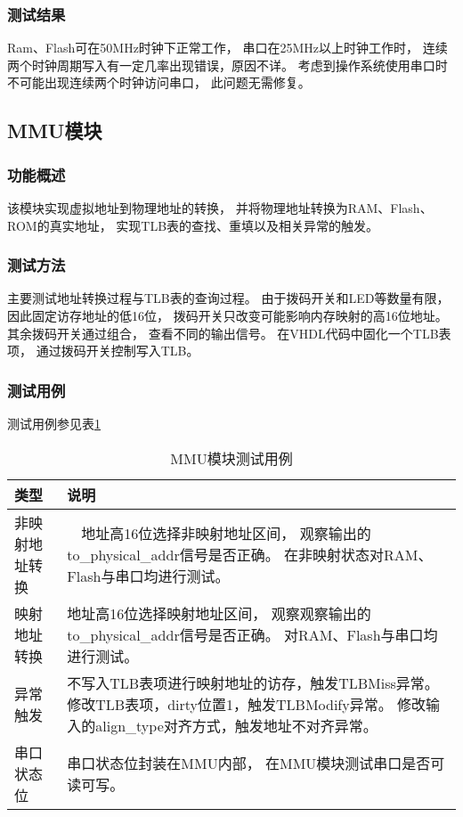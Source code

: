         \subsubsection{测试结果}
            Ram、Flash可在50MHz时钟下正常工作，%
            串口在25MHz以上时钟工作时，%
            连续两个时钟周期写入有一定几率出现错误，原因不详。%
            考虑到操作系统使用串口时不可能出现连续两个时钟访问串口，%
            此问题无需修复。

    \subsection{MMU模块}
        \subsubsection{功能概述}
            该模块实现虚拟地址到物理地址的转换，%
            并将物理地址转换为RAM、Flash、ROM的真实地址，%
            实现TLB表的查找、重填以及相关异常的触发。%

        \subsubsection{测试方法}
            主要测试地址转换过程与TLB表的查询过程。%
            由于拨码开关和LED等数量有限，%
            因此固定访存地址的低16位，%
            拨码开关只改变可能影响内存映射的高16位地址。%
            其余拨码开关通过组合，%
            查看不同的输出信号。%
            在VHDL代码中固化一个TLB表项，%
            通过拨码开关控制写入TLB。

        \subsubsection{测试用例}
            测试用例参见表\ref{mmu_module}
            \begin{table}[!hbp]
            \centering
            \caption{MMU模块测试用例}
            \label{mmu_module}
            \begin{tabularx}{\textwidth}{|l|X|}
            \hline
            类型 & 说明 \\
            \hline
            非映射地址转换 &　地址高16位选择非映射地址区间，%
                            观察输出的to\_physical\_addr信号是否正确。%
                            在非映射状态对RAM、Flash与串口均进行测试。   \\
            \hline
            映射地址转换 & 地址高16位选择映射地址区间，%
                            观察观察输出的to\_physical\_addr信号是否正确。%
                            对RAM、Flash与串口均进行测试。    \\
            \hline
            异常触发 & 不写入TLB表项进行映射地址的访存，触发TLBMiss异常。%
                        修改TLB表项，dirty位置1，触发TLBModify异常。%
                        修改输入的align\_type对齐方式，触发地址不对齐异常。    \\
            \hline
            串口状态位 & 串口状态位封装在MMU内部，%
                        在MMU模块测试串口是否可读可写。 \\
            \hline
            \end{tabularx}
            \end{table}

